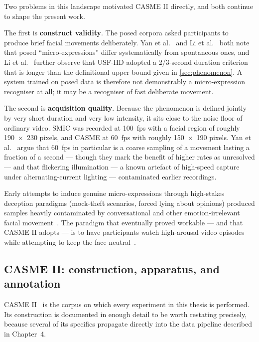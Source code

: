 Two problems in this landscape motivated CASME II directly, and both continue to shape the present work.

The first is \textbf{construct validity}. The posed corpora asked participants to produce brief facial movements deliberately. Yan et al.~\cite{yan2014} and Li et al.~\cite{liX2013} both note that posed ``micro-expressions'' differ systematically from spontaneous ones, and Li et al.~\cite{liX2013} further observe that USF-HD adopted a 2/3-second duration criterion that is longer than the definitional upper bound given in \autoref{sec:phenomenon}. A system trained on posed data is therefore not demonstrably a micro-expression recogniser at all; it may be a recogniser of fast deliberate movement.

The second is \textbf{acquisition quality}. Because the phenomenon is defined jointly by very short duration and very low intensity, it sits close to the noise floor of ordinary video. SMIC was recorded at 100~fps with a facial region of roughly 190~$\times$~230 pixels, and CASME at 60~fps with roughly 150~$\times$~190 pixels. Yan et al.~\cite{yan2014} argue that 60~fps in particular is a coarse sampling of a movement lasting a fraction of a second --- though they mark the benefit of higher rates as unresolved --- and that flickering illumination --- a known artefact of high-speed capture under alternating-current lighting --- contaminated earlier recordings.

Early attempts to induce genuine micro-expressions through high-stakes deception paradigms (mock-theft scenarios, forced lying about opinions) produced samples heavily contaminated by conversational and other emotion-irrelevant facial movement~\cite{yan2014}. The paradigm that eventually proved workable --- and that CASME II adopts --- is to have participants watch high-arousal video episodes while attempting to keep the face neutral~\cite{liX2013}.

\subsection{CASME II: construction, apparatus, and annotation}
\label{sec:casme2-construction}

CASME II~\cite{yan2014} is the corpus on which every experiment in this thesis is performed. Its construction is documented in enough detail to be worth restating precisely, because several of its specifics propagate directly into the data pipeline described in Chapter~4.

